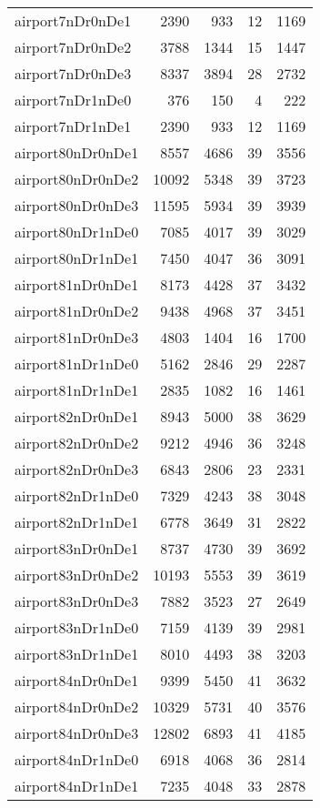 \begin{longtable}{lrrrr}
airport7nDr0nDe1 & 2390 & 933 & 12 & 1169 \\
airport7nDr0nDe2 & 3788 & 1344 & 15 & 1447 \\
airport7nDr0nDe3 & 8337 & 3894 & 28 & 2732 \\
airport7nDr1nDe0 & 376 & 150 & 4 & 222 \\
airport7nDr1nDe1 & 2390 & 933 & 12 & 1169 \\
airport80nDr0nDe1 & 8557 & 4686 & 39 & 3556 \\
airport80nDr0nDe2 & 10092 & 5348 & 39 & 3723 \\
airport80nDr0nDe3 & 11595 & 5934 & 39 & 3939 \\
airport80nDr1nDe0 & 7085 & 4017 & 39 & 3029 \\
airport80nDr1nDe1 & 7450 & 4047 & 36 & 3091 \\
airport81nDr0nDe1 & 8173 & 4428 & 37 & 3432 \\
airport81nDr0nDe2 & 9438 & 4968 & 37 & 3451 \\
airport81nDr0nDe3 & 4803 & 1404 & 16 & 1700 \\
airport81nDr1nDe0 & 5162 & 2846 & 29 & 2287 \\
airport81nDr1nDe1 & 2835 & 1082 & 16 & 1461 \\
airport82nDr0nDe1 & 8943 & 5000 & 38 & 3629 \\
airport82nDr0nDe2 & 9212 & 4946 & 36 & 3248 \\
airport82nDr0nDe3 & 6843 & 2806 & 23 & 2331 \\
airport82nDr1nDe0 & 7329 & 4243 & 38 & 3048 \\
airport82nDr1nDe1 & 6778 & 3649 & 31 & 2822 \\
airport83nDr0nDe1 & 8737 & 4730 & 39 & 3692 \\
airport83nDr0nDe2 & 10193 & 5553 & 39 & 3619 \\
airport83nDr0nDe3 & 7882 & 3523 & 27 & 2649 \\
airport83nDr1nDe0 & 7159 & 4139 & 39 & 2981 \\
airport83nDr1nDe1 & 8010 & 4493 & 38 & 3203 \\
airport84nDr0nDe1 & 9399 & 5450 & 41 & 3632 \\
airport84nDr0nDe2 & 10329 & 5731 & 40 & 3576 \\
airport84nDr0nDe3 & 12802 & 6893 & 41 & 4185 \\
airport84nDr1nDe0 & 6918 & 4068 & 36 & 2814 \\
airport84nDr1nDe1 & 7235 & 4048 & 33 & 2878 \\

\end{longtable}

